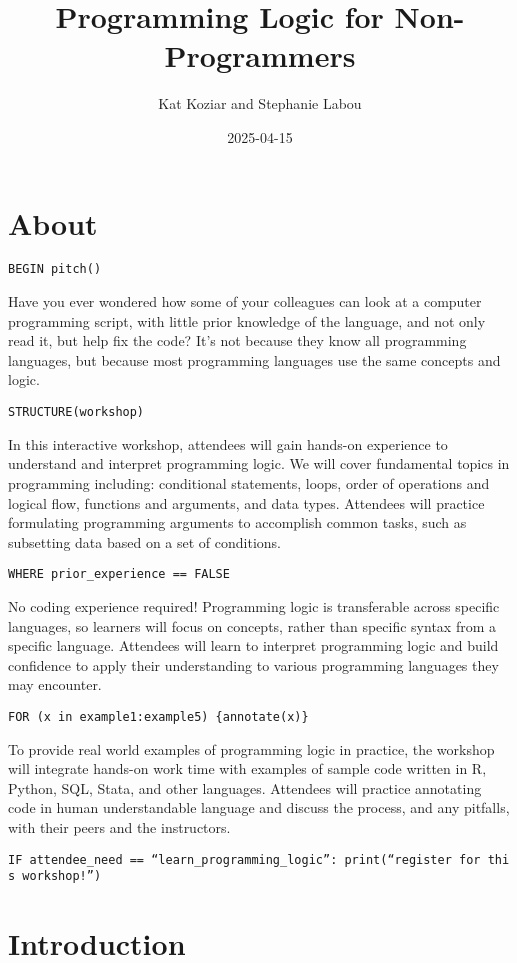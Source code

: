 \documentclass[
]{book}
\title{Programming Logic for Non-Programmers}
\author{Kat Koziar and Stephanie Labou}
\date{2025-04-15}
\begin{document}
\maketitle

{
\setcounter{tocdepth}{1}
\tableofcontents
}
\chapter{About}\label{about}

\texttt{BEGIN\ pitch()}

Have you ever wondered how some of your colleagues can look at a computer programming script, with little prior knowledge of the language, and not only read it, but help fix the code? It's not because they know all programming languages, but because most programming languages use the same concepts and logic.

\texttt{STRUCTURE(workshop)}

In this interactive workshop, attendees will gain hands-on experience to understand and interpret programming logic. We will cover fundamental topics in programming including: conditional statements, loops, order of operations and logical flow, functions and arguments, and data types. Attendees will practice formulating programming arguments to accomplish common tasks, such as subsetting data based on a set of conditions.

\texttt{WHERE\ prior\_experience\ ==\ FALSE}

No coding experience required! Programming logic is transferable across specific languages, so learners will focus on concepts, rather than specific syntax from a specific language. Attendees will learn to interpret programming logic and build confidence to apply their understanding to various programming languages they may encounter.

\texttt{FOR\ (x\ in\ example1:example5)\ \{annotate(x)\}}

To provide real world examples of programming logic in practice, the workshop will integrate hands-on work time with examples of sample code written in R, Python, SQL, Stata, and other languages. Attendees will practice annotating code in human understandable language and discuss the process, and any pitfalls, with their peers and the instructors.

\texttt{IF\ attendee\_need\ ==\ “learn\_programming\_logic”:\ print(“register\ for\ this\ workshop!”)}

\chapter{Introduction}\label{intro}
\end{document}
